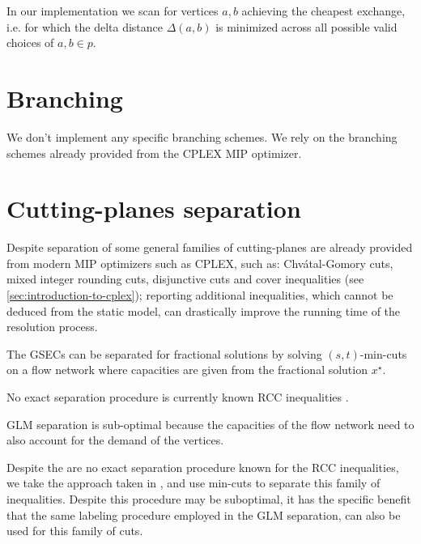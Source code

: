 In our implementation
we scan for vertices $a, b$ achieving the cheapest exchange,
i.e. for which the delta distance $\Delta(a, b)$ is minimized across all possible valid choices of $a, b \in p$.

\section{Branching}
\label{sec:impl-branching}

We don't implement any specific branching schemes.
We rely on the branching schemes already provided from the CPLEX MIP optimizer.


\section{Cutting-planes separation}
\label{sec:impl-separation-techniques}

Despite separation of some general families of cutting-planes are already provided
from modern MIP optimizers such as CPLEX, such as:
Chvátal-Gomory cuts, mixed integer rounding cuts, disjunctive cuts
and cover inequalities (see \cref{sec:introduction-to-cplex});
reporting additional inequalities, which cannot be deduced from the static model,
can drastically improve the running time of the resolution process.


The GSECs can be separated for fractional solutions by solving $(s, t)$-min-cuts
on a flow network where capacities are given from the fractional solution $x^\star$.

No exact separation procedure is currently known RCC inequalities \parencite{jepsen2014}.

GLM separation is sub-optimal because  the capacities
of the flow network need to also account for the demand of the vertices.

Despite the are no exact separation procedure known for the RCC inequalities,
we take the approach taken in \textcite{jepsen2014},
and use min-cuts to separate this family of inequalities.
Despite this procedure may be suboptimal, it has the specific
benefit that the same labeling procedure employed in the GLM separation,
can also be used for this family of cuts.


